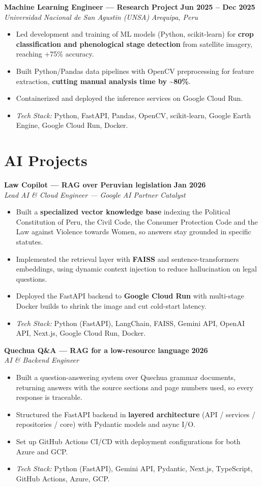 \documentclass[11pt,letterpaper]{article}
\newcommand{\cventry}[4]{%
  \textbf{#1} \hfill \textbf{#2}\\
  \textit{#3} \hfill \textit{#4}\par\nobreak\vspace{1pt}%
}
\begin{document}
\cventry{Machine Learning Engineer --- Research Project}{Jun 2025 -- Dec 2025}{Universidad Nacional de San Agustin (UNSA)}{Arequipa, Peru}
\begin{itemize}
  \item Led development and training of ML models (Python, scikit-learn) for \textbf{crop classification and phenological stage detection} from satellite imagery, reaching +75\% accuracy.
  \item Built Python/Pandas data pipelines with OpenCV preprocessing for feature extraction, \textbf{cutting manual analysis time by \textasciitilde80\%}.
  \item Containerized and deployed the inference services on Google Cloud Run.
  \item \textit{Tech Stack:} Python, FastAPI, Pandas, OpenCV, scikit-learn, Google Earth Engine, Google Cloud Run, Docker.
\end{itemize}

\section{AI Projects}

\cventry{Law Copilot --- RAG over Peruvian legislation}{Jan 2026}{Lead AI \& Cloud Engineer --- Google AI Partner Catalyst}{}
\begin{itemize}
  \item Built a \textbf{specialized vector knowledge base} indexing the Political Constitution of Peru, the Civil Code, the Consumer Protection Code and the Law against Violence towards Women, so answers stay grounded in specific statutes.
  \item Implemented the retrieval layer with \textbf{FAISS} and sentence-transformers embeddings, using dynamic context injection to reduce hallucination on legal questions.
  \item Deployed the FastAPI backend to \textbf{Google Cloud Run} with multi-stage Docker builds to shrink the image and cut cold-start latency.
  \item \textit{Tech Stack:} Python (FastAPI), LangChain, FAISS, Gemini API, OpenAI API, Next.js, Google Cloud Run, Docker.
\end{itemize}

\cventry{Quechua Q\&A --- RAG for a low-resource language}{2026}{AI \& Backend Engineer}{}
\begin{itemize}
  \item Built a question-answering system over Quechua grammar documents, returning answers with the source sections and page numbers used, so every response is traceable.
  \item Structured the FastAPI backend in \textbf{layered architecture} (API / services / repositories / core) with Pydantic models and async I/O.
  \item Set up GitHub Actions CI/CD with deployment configurations for both Azure and GCP.
  \item \textit{Tech Stack:} Python (FastAPI), Gemini API, Pydantic, Next.js, TypeScript, GitHub Actions, Azure, GCP.
\end{itemize}
\end{document}
